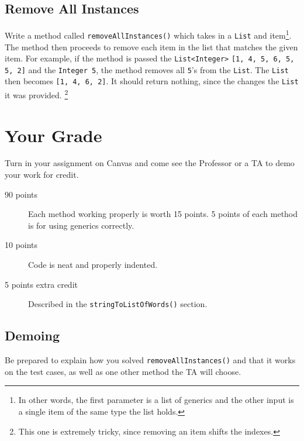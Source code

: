 \documentclass[10pt,letterpaper]{article}
\begin{document}
	
	
	\subsection{Remove All Instances}
	Write a method called \texttt{removeAllInstances()} which takes in a \texttt{List} and item\footnote{In other words, the first parameter is a list of generics and the other input is a single item of the same type the list holds.}.
	The method then proceeds to remove each item in the list that matches the given item.
	For example, if the method is passed the \texttt{List<Integer>} \texttt{[1, 4, 5, 6, 5, 5, 2]} and the \texttt{Integer }\texttt{5}, the method removes all \texttt{5}'s from the \texttt{List}.
	The \texttt{List} then becomes \texttt{[1, 4, 6, 2]}.
	It should return nothing, since the changes the \texttt{List} it was provided.
	\footnote{This one is extremely tricky, since removing an item shifts the indexes.}
	
	
	
	
	
	
	\section{Your Grade}
	Turn in your assignment on Canvas and come see the Professor or a TA to demo your work for credit.
	
	\begin{description}
		\item[90 points] Each method working properly is worth 15 points.  5 points of each method is for using generics correctly.
		\item[10 points] Code is neat and properly indented.
		\item[5 points extra credit] Described in the  \texttt{stringToListOfWords()} section.
		
	\end{description}


	\subsection{Demoing}
	Be prepared to explain how you solved \texttt{removeAllInstances()} and that it works on the test cases, as well as one other method the TA will choose.
	
\end{document}
